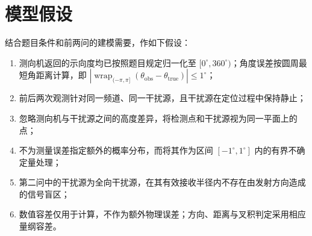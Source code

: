 \section{模型假设}

结合题目条件和前两问的建模需要，作如下假设：

\begin{enumerate}
  \item 测向机返回的示向度均已按照题目规定归一化至 $[0^\circ,360^\circ)$；角度误差按圆周最短角距离计算，即
  $\left|\operatorname{wrap}_{(-\pi,\pi]}(\theta_{\mathrm{obs}}-\theta_{\mathrm{true}})\right|\leq1^\circ$；
  \item 前后两次观测针对同一频道、同一干扰源，且干扰源在定位过程中保持静止；
  \item 忽略测向机与干扰源之间的高度差异，将检测点和干扰源视为同一平面上的点；
  \item 不为测量误差指定额外的概率分布，而将其作为区间 $[-1^\circ,1^\circ]$ 内的有界不确定量处理；
  \item 第二问中的干扰源为全向干扰源，在其有效接收半径内不存在由发射方向造成的信号盲区；
  \item 数值容差仅用于计算，不作为额外物理误差；方向、距离与叉积判定采用相应量纲容差。
\end{enumerate}
